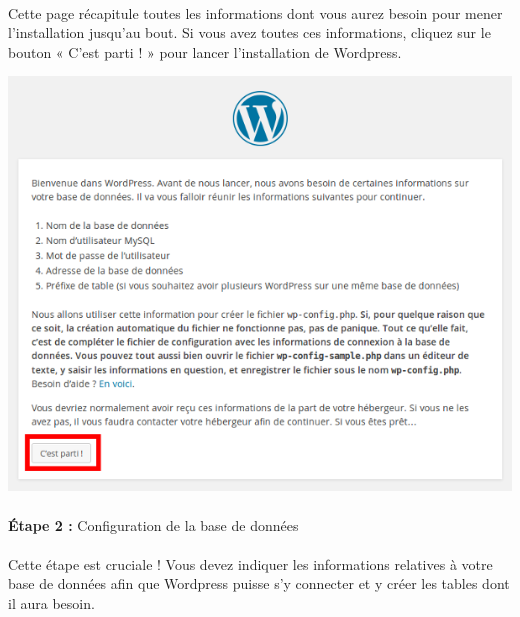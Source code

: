 \documentclass[10pt,a4paper]{article}
\begin{document}
\paragraph{}Cette page récapitule toutes les informations dont vous aurez besoin pour mener l'installation jusqu'au bout. Si vous avez toutes ces informations, cliquez sur le bouton « C'est parti ! » pour lancer l'installation de Wordpress.
\begin{center}
\includegraphics[scale=0.5]{img/0040.png}
\end{center}
\paragraph{}\textbf{Étape 2 : }Configuration de la base de données
\paragraph{}Cette étape est cruciale ! Vous devez indiquer les informations relatives à votre base de données afin que Wordpress puisse s'y connecter et y créer les tables dont il aura besoin.
\end{document}
